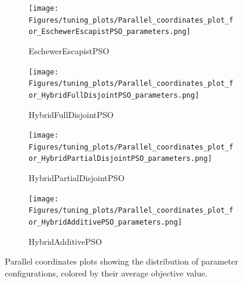 \begin{figure}[t]\ContinuedFloat
    \centering
    \begin{subfigure}{0.49\textwidth}
        \centering
        \texttt{[image: Figures/tuning\_plots/Parallel\_coordinates\_plot\_for\_EschewerEscapistPSO\_parameters.png]}
        \caption{EschewerEscapistPSO}
    \end{subfigure}
    \begin{subfigure}{0.49\textwidth}
        \centering
        \texttt{[image: Figures/tuning\_plots/Parallel\_coordinates\_plot\_for\_HybridFullDisjointPSO\_parameters.png]}
        \caption{HybridFullDisjointPSO}
    \end{subfigure}
    \begin{subfigure}{0.49\textwidth}
        \centering
        \texttt{[image: Figures/tuning\_plots/Parallel\_coordinates\_plot\_for\_HybridPartialDisjointPSO\_parameters.png]}
        \caption{HybridPartialDisjointPSO}
    \end{subfigure}
    \begin{subfigure}{0.49\textwidth}
        \centering
        \texttt{[image: Figures/tuning\_plots/Parallel\_coordinates\_plot\_for\_HybridAdditivePSO\_parameters.png]}
        \caption{HybridAdditivePSO}
    \end{subfigure}
\caption[Parallel coordinates plots of parameter configurations]{Parallel coordinates plots showing the distribution of  parameter configurations, colored by their average objective value.}
\label{fig:parameter_plots}
\end{figure}